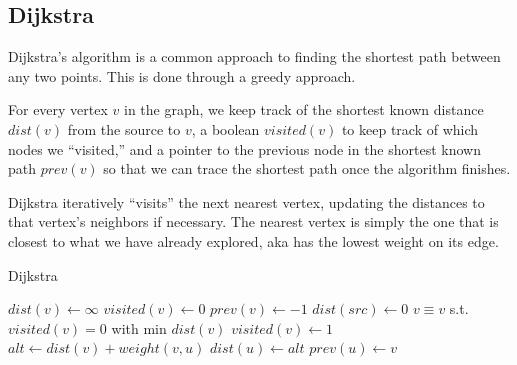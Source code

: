 \documentclass{article}
\begin{document}
\subsection{Dijkstra}

Dijkstra's algorithm is a common approach to finding the shortest path between any two points. This is done through a greedy approach. 

For every vertex $v$ in the graph, we keep track of the shortest known distance $dist(v)$ from the source to $v$, a boolean $visited(v)$ to keep track of which nodes we ``visited,'' and a pointer to the previous node in the shortest known path $prev(v)$ so that we can trace the shortest path once the algorithm finishes.

Dijkstra iteratively ``visits'' the next nearest vertex, updating the distances to that vertex's neighbors if necessary. The nearest vertex is simply the one that is closest to what we have already explored, aka has the lowest weight on its edge.

\begin{algorithm}[H]
\caption{Dijkstra}
\begin{algorithmic}
	\State $dist(v) \gets \infty$
	\State $visited(v) \gets 0$
    \State $prev(v) \gets -1$
\EndFor
\State $dist(src) \gets 0$
	\State $v \equiv v$ s.t. $visited(v)=0$ with min $dist(v)$
    \State $visited(v) \gets 1$
    		\State $alt \gets dist(v) + weight(v, u)$
				\State $dist(u) \gets alt$
   	        	\State $prev(u) \gets v$
			\EndIf
        \EndIf
    \EndFor
\EndWhile
\end{algorithmic}
\end{algorithm}

\begin{center}
\end{center}
\end{document}
